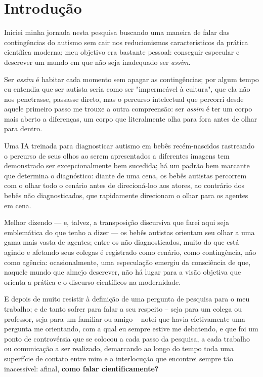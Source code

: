 \chapter{Introdução}
\label{cap:introducao}


Iniciei minha jornada nesta pesquisa buscando uma maneira de falar das contingências do autismo sem cair nos reducionismos característicos da prática científica moderna; 
    meu objetivo era bastante pessoal: 
        conseguir especular e descrever um mundo em que não seja inadequado ser \textit{assim}.

Ser \textit{assim} é habitar cada momento sem apagar as contingências;
    por algum tempo eu entendia que ser autista seria como ser "impermeável à cultura", que ela não nos penetrasse, passasse direto, mas o percurso intelectual que percorri desde aquele primeiro passo me trouxe a outra compreensão:
        ser \textit{assim} é ter um corpo mais aberto a diferenças, um corpo que literalmente olha para fora antes de olhar para dentro.

Uma IA treinada para diagnosticar autismo em bebês recém-nascidos rastreando o percurso de seus olhos ao serem apresentados a diferentes imagens tem demonstrado ser excepcionalmente bem sucedida;
    há um padrão bem marcante que determina o diagnóstico:
        diante de uma cena, os bebês autistas percorrem com o olhar todo o cenário antes de direcioná-loo aos atores, ao contrário dos bebês não diagnosticados, que rapidamente direcionam o olhar para os agentes em cena.

Melhor dizendo --- e, talvez, a transposição discursiva que farei aqui seja emblemática do que tenho a dizer --- os bebês autistas orientam seu olhar a uma gama mais vasta de agentes;
    entre os não diagnosticados, muito do que está agindo e afetando seus colegas é registrado como cenário, como contingência, não como agência:
        ocasionalmente, uma especulação emergiu da consciência de que, naquele mundo que almejo descrever, não há lugar para a visão objetiva que orienta a prática e o discurso científicos na modernidade.

E depois de muito resistir à definição de uma pergunta de pesquisa para o meu trabalho;
    e de tanto sofrer para falar a seu respeito -- seja para um colega ou professor, seja para um familiar ou amigo -- notei que havia efetivamente uma pergunta me orientando, com a qual eu sempre estive me debatendo, e que foi um ponto de controvérsia que se colocou a cada passo da pesquisa, a cada trabalho ou comunicação a ser realizado, demarcando ao longo do tempo toda uma superfície de contato entre mim e a interlocução que encontrei sempre tão inacessível:
        afinal, \textbf{como falar cientificamente?}

